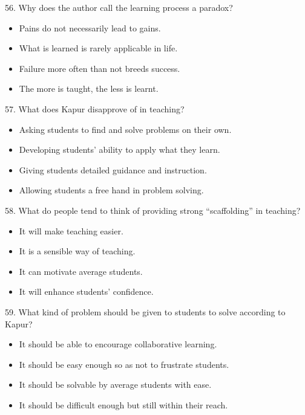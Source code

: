 \documentclass[UTF8,11pt]{ctexart}
\begin{document}
56. Why does the author call the learning process a paradox?


\begin{itemize}[leftmargin=2em,itemsep=.2em,topsep=.4em]\item[A.] Pains do not necessarily lead to gains.
\item[B.] What is learned is rarely applicable in life.
\item[C.] Failure more often than not breeds success.
\end{itemize}

\begin{itemize}[leftmargin=2em,itemsep=.2em,topsep=.4em]\item[D.] The more is taught, the less is learnt.
\end{itemize}

57. What does Kapur disapprove of in teaching?


\begin{itemize}[leftmargin=2em,itemsep=.2em,topsep=.4em]\item[A.] Asking students to find and solve problems on their own.
\item[B.] Developing students’ ability to apply what they learn.
\item[C.] Giving students detailed guidance and instruction.
\item[D.] Allowing students a free hand in problem solving.
\end{itemize}

58. What do people tend to think of providing strong “scaffolding” in teaching?


\begin{itemize}[leftmargin=2em,itemsep=.2em,topsep=.4em]\item[A.] It will make teaching easier.
\item[B.] It is a sensible way of teaching.
\item[C.] It can motivate average students.
\item[D.] It will enhance students’ confidence.
\end{itemize}

59. What kind of problem should be given to students to solve according to Kapur?


\begin{itemize}[leftmargin=2em,itemsep=.2em,topsep=.4em]\item[A.] It should be able to encourage collaborative learning.
\item[B.] It should be easy enough so as not to frustrate students.
\item[C.] It should be solvable by average students with ease.
\item[D.] It should be difficult enough but still within their reach.
\end{itemize}
\end{document}
